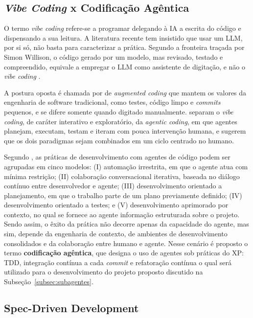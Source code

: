 \subsection{\textit{Vibe Coding} x Codificação Agêntica}
\label{subsec:agentic}

O termo \textit{vibe coding} refere-se a programar delegando à IA a escrita do código e dispensando a sua leitura. A literatura recente tem insistido que usar um LLM, por si só, não basta para caracterizar a prática. Segundo a fronteira traçada por Simon Willison, o código gerado por um modelo, mas revisado, testado e compreendido, equivale a empregar o LLM como assistente de digitação, e não o \textit{vibe coding} \cite{vibe_review_2026}.

A postura oposta é chamada por  de \textit{augmented coding} que mantem os valores da engenharia de software tradicional, como testes, código limpo e \textit{commits} pequenos, e se difere somente quando digitado manualmente.  separam o \textit{vibe coding}, de caráter interativo e exploratório, da \textit{agentic coding}, em que agentes planejam, executam, testam e iteram com pouca intervenção humana, e sugerem que os dois paradigmas sejam combinados em um ciclo centrado no humano.

Segundo , as práticas de desenvolvimento com agentes de código podem ser agrupadas em cinco modelos: (I) automação irrestrita, em que o agente atua com mínima restrição; (II) colaboração conversacional iterativa, baseada no diálogo contínuo entre desenvolvedor e agente; (III) desenvolvimento orientado a planejamento, em que o trabalho parte de um plano previamente definido; (IV) desenvolvimento orientado a testes; e (V) desenvolvimento aprimorado por contexto, no qual se fornece ao agente informação estruturada sobre o projeto. Sendo assim, o êxito da prática não decorre apenas da capacidade do agente, mas sim, depende da engenharia de contexto, de ambientes de desenvolvimento consolidados e da colaboração entre humano e agente. Nesse cenário é proposto o termo \textbf{codificação agêntica}, que designa o uso de agentes sob práticas do XP: TDD, integração contínua a cada \textit{commit} e refatoração contínua o qual será utilizado para o desenvolvimento do projeto proposto discutido na Subseção~\ref{subsec:subagentes}.


\subsection{Spec-Driven Development}
\label{subsec:sdd}

